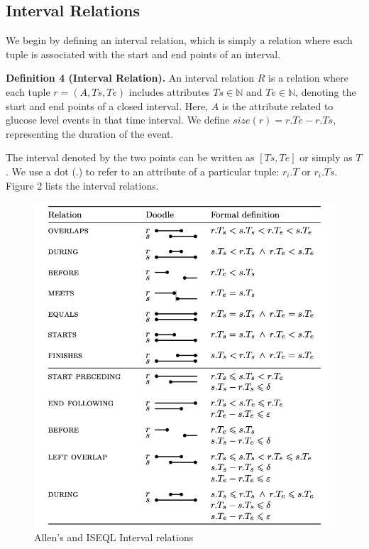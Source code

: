 \documentclass{article}
\begin{document}
\subsection{Interval Relations}

We begin by defining an interval relation, which is simply a relation where each tuple is associated with the start and end points of an interval.

\textbf{Definition 4 (Interval Relation).} An interval relation \(R\) is a relation where each tuple \(r = (A, Ts, Te)\) includes attributes \(Ts \in \mathbb{N}\) and \(Te \in \mathbb{N}\), denoting the start and end points of a closed interval. Here, \(A\) is the attribute related to glucose level events in that time interval. We define \(\textit{size}(r) = r.Te - r.Ts\), representing the duration of the event.

The interval denoted by the two points can be written as \([Ts, Te]\) or simply as \(T\). We use a dot (.) to refer to an attribute of a particular tuple: \(r_i.T\) or \(r_i.Ts\). Figure 2 lists the interval relations.

\pagebreak


\begin{figure}[h]
    \centering
    \includegraphics[width=1.0\textwidth]{Images/allen.png}
    \caption{Allen's and ISEQL Interval relations}
    \label{fig:allen}
\end{figure}
\end{document}
